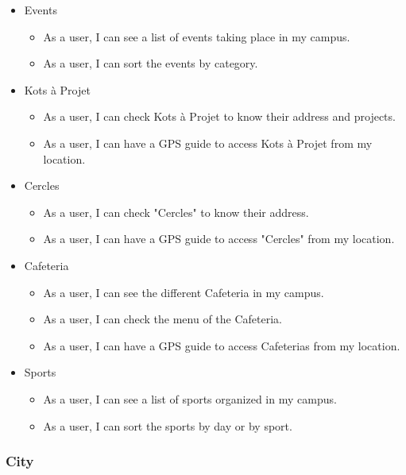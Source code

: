 \documentclass{eplmastersthesis}
\begin{document}
\begin{itemize}

\item{Events}
\begin{itemize} 
\item As a user, I can see a list of events taking place in my campus.
\item As a user, I can sort the events by category.
\end{itemize}

\item{Kots à Projet}
\begin{itemize}
\item As a user, I can check Kots à Projet to know their address and projects.
\item As a user, I can have a GPS guide to access Kots à Projet from my location.
\end{itemize}

\item{Cercles}
\begin{itemize}
\item As a user, I can check "Cercles" to know their address.
\item As a user, I can have a GPS guide to access "Cercles" from my location.
\end{itemize}

\item{Cafeteria}
\begin{itemize}
\item As a user, I can see the different Cafeteria in my campus.
\item As a user, I can check the menu of the Cafeteria.
\item As a user, I can have a GPS guide to access Cafeterias from my location.
\end{itemize}

\item{Sports}
\begin{itemize}
\item As a user, I can see a list of sports organized in my campus.
\item As a user, I can sort the sports by day or by sport.
\end{itemize}

\end{itemize}

\subsubsection{City}
\end{document}
